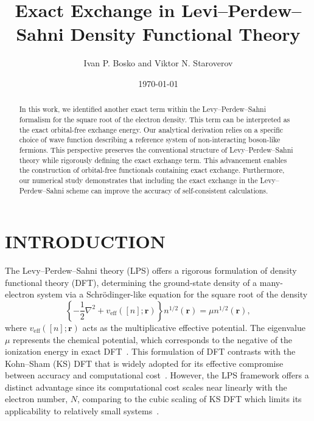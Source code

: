 \documentclass[%
 reprint,
 amsmath,amssymb,
 aps,
pra,
]{revtex4-2}
\begin{document}
\title{Exact Exchange in Levi--Perdew--Sahni Density Functional Theory}%

\author{Ivan P. Bosko and Viktor N. Staroverov}
%

\date{\today}

\begin{abstract}
In this work, we identified another exact term within the Levy--Perdew--Sahni formalism for the square root of the electron density. This term can be interpreted as the exact orbital-free exchange energy. Our analytical derivation relies on a specific choice of wave function describing a reference system of non-interacting boson-like fermions. This perspective preserves the conventional structure of Levy--Perdew--Sahni theory while rigorously defining the exact exchange term. This advancement enables the construction of orbital-free functionals containing exact exchange. Furthermore, our numerical study demonstrates that including the exact exchange in the Levy--Perdew--Sahni scheme can improve the accuracy of self-consistent calculations.
\end{abstract}
\maketitle

\section{INTRODUCTION}

The Levy--Perdew--Sahni theory (LPS) offers a rigorous formulation of density functional theory (DFT), determining the ground-state density of a many-electron system via a Schrödinger-like equation for the square root of the density
\begin{equation}\label{eq: LPS Differential Equation}
    \left\{
    -\frac{1}{2}\nabla^2
    +
    v_{\text{eff}}([n];\textbf{r})
    \right\}
    n^{1/2}(\textbf{r})
    =
    \mu n^{1/2}(\textbf{r}),
\end{equation} 
where $v_{\text{eff}}([n];\textbf{r})$ acts as the multiplicative effective potential. The eigenvalue $\mu$ represents the chemical potential, which corresponds to the negative of the ionization energy in exact DFT~\cite{Levy.1984.PRA.30.2745}. This formulation of DFT contrasts with the Kohn--Sham (KS) DFT that is widely adopted for its effective compromise between accuracy and computational cost~\cite{Hohenberg.1964.PR.136.B864, Kohn.1965.PR.140.A1133, Parr.1989.density}. However, the LPS framework offers a distinct advantage since its computational cost scales near linearly with the electron number, $N$, comparing to the cubic scaling of KS DFT which limits its applicability to relatively small systems~\cite{Mi.2023.CR.123.12039}.
\end{document}
